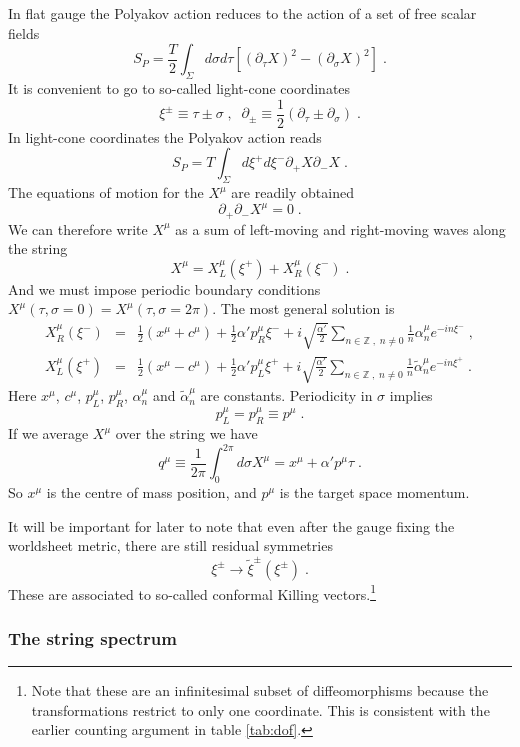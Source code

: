 \documentclass[11pt,a4paper]{article}
\numberwithin{equation}{section}
\numberwithin{table}{section}\setlength{\multlinegap}{25pt}
\newcommand{\bea}{\begin{eqnarray}}  \newcommand{\eea}{\end{eqnarray}}
\newcommand{\nn}{\nonumber}
\newcommand{\be}{\begin{equation}}
\newcommand{\ee}{\end{equation}}
\begin{document}
In flat gauge the Polyakov action reduces to the action of a set of free scalar fields
\be
S_P = \frac{T}{2} \int_{\Sigma} d\sigma d\tau \left[ \left(\partial_{\tau} X \right)^2 - \left(\partial_{\sigma} X \right)^2 \right] \;.
\ee
It is convenient to go to so-called light-cone coordinates
\be
\xi^{\pm} \equiv \tau \pm \sigma \;,\;\; \partial_{\pm} \equiv \frac12 \left(\partial_{\tau}  \pm \partial_{\sigma}  \right)\;.
\ee
In light-cone coordinates the Polyakov action reads
\be
S_P = T  \int_{\Sigma} d\xi^{+}d\xi^- \partial_+ X \partial_- X \;.
\ee
The equations of motion for the $X^{\mu}$ are readily obtained
\be
\partial_+ \partial_- X^{\mu} = 0 \;.
\ee
We can therefore write $X^{\mu}$ as a sum of left-moving and right-moving waves along the string
\be
X^{\mu} = X^{\mu}_L\left(\xi^+\right) + X^{\mu}_R\left(\xi^-\right) \;.
\ee
And we must impose periodic boundary conditions $X^{\mu} \left(\tau,\sigma=0 \right) = X^{\mu} \left(\tau,\sigma=2\pi\right)$. The most general solution is 
\bea
X_R^{\mu} \left(\xi^- \right) &=& \frac12 \left(x^{\mu}+c^{\mu}\right) + \frac12 \alpha' p_R^{\mu}\xi^- + i \sqrt{\frac{\alpha'}{2}} \sum_{n \in \mathbb{Z}\;,\; n \neq 0} \frac{1}{n} \alpha_n^{\mu} e^{-i n \xi^-} \;, \nn \\
X_L^{\mu} \left(\xi^+ \right) &=& \frac12 \left(x^{\mu}-c^{\mu}\right) + \frac12 \alpha' p_L^{\mu}\xi^+ + i \sqrt{\frac{\alpha'}{2}} \sum_{n \in \mathbb{Z}\;,\; n \neq 0} \frac{1}{n} \tilde{\alpha}_n^{\mu} e^{-i n \xi^+} \;.
\label{gemodex}
\eea
Here $x^{\mu}$, $c^{\mu}$, $p_L^{\mu}$, $p_R^{\mu}$, $\alpha_n^{\mu}$ and $\tilde{\alpha}_n^{\mu}$ are constants. Periodicity in $\sigma$ implies
\be
p_L^{\mu} = p_R^{\mu} \equiv p^{\mu} \;. 
\ee 
If we average $X^{\mu}$ over the string we have
\be
q^{\mu} \equiv \frac{1}{2\pi} \int_0^{2\pi} d \sigma X^{\mu} = x^{\mu} + \alpha' p^{\mu} \tau \;.
\ee
So $x^{\mu}$ is the centre of mass position, and $p^{\mu}$ is the target space momentum. 

It will be important for later to note that even after the gauge fixing the worldsheet metric, there are still residual symmetries 
\be
\xi^{\pm} \rightarrow \tilde{\xi}^{\pm}\left(\xi^{\pm}\right) \;.
\label{rckvs}
\ee
These are associated to so-called conformal Killing vectors.\footnote{Note that these are an infinitesimal subset of diffeomorphisms because the transformations restrict to only one coordinate. This is consistent with the earlier counting argument in table \ref{tab:dof}.}

\subsubsection{The string spectrum}
\label{sec:2sp}
\end{document}
